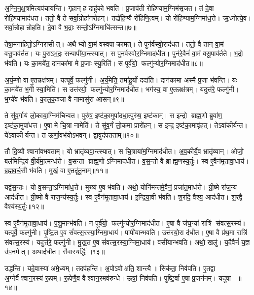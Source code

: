 अ॒ग्नि॒न॒क्ष॒त्रमित्यप॑चायन्ति।
गृ॒हान् ह॒ दाहु॑को भवति।
प्र॒जाप॑ती रोहि॒ण्याम॒ग्निम॑सृजत।
तं दे॒वा रो॑हि॒ण्यामाद॑धत।
ततो॒ वै ते सर्वा॒न्रोहा॑नरोहन्।
तद्रो॑हि॒ण्यै रो॑हिणि॒त्वम्।
यो रो॑हि॒ण्याम॒ग्निमा॑ध॒त्ते।
ऋ॒ध्नोत्ये॒व।
सर्वा॒न्रोहान्रोहति।
दे॒वा वै भ॒द्राः सन्तो॒ऽग्निमाधि॑त्सन्त॥७॥

तेषा॒मना॑हितो॒ऽग्निरासीत्।
अथैभ्यो वा॒मं वस्वपाक्रामत्।
ते पुन॑र्वस्वो॒राद॑धत।
ततो॒ वै तान् वा॒मं वसू॒पाव॑र्तत।
यः पु॒राऽभ॒द्रः सन्पापी॑या॒न्त्स्यात्।
स पुन॑र्वस्वोर॒ग्निमाद॑धीत।
पुन॑रे॒वैनं॑ वा॒मं वसू॒पाव॑र्तते।
भ॒द्रो भ॑वति।
यः का॒मये॑त॒ दानका॑मा मे प्र॒जाः स्यु॒रिति॑।
स पूर्व॑यो॒ फल्गु॑न्योर॒ग्निमाद॑धीत॥८॥

अ॒र्य॒म्णो वा ए॒तन्नक्ष॑त्रम्।
यत्पूर्वे॒ फल्गु॑नी।
अ॒र्य॒मेति॒ तमा॑हु॒र्यो ददा॑ति।
दान॑कामा अस्मै प्र॒जा भ॑वन्ति।
यः का॒मये॑त भ॒गी स्या॒मिति॑।
स उत्त॑रयो॒ फल्गु॑न्योर॒ग्निमाद॑धीत।
भग॑स्य॒ वा ए॒तन्नक्ष॑त्रम्।
यदुत्त॑रे॒ फल्गु॑नी।
भ॒ग्ये॑व भ॑वति।
का॒ल॒क॒ञ्जा वै नामासु॑रा आसन्॥९॥

ते सु॑व॒र्गाय॑ लो॒काया॒ग्निम॑चिन्वत।
पुरु॑ष॒ इष्ट॑का॒मुपा॑दधा॒त्पुरु॑ष॒ इष्ट॑काम्।
स इन्द्रो ब्राह्म॒णो ब्रुवा॑ण॒ इष्ट॑का॒मुपा॑धत्त।
ए॒षा मे॑ चि॒त्रा नामेति॑।
ते सु॑व॒र्गं लो॒कमा प्रारो॑हन्।
स इन्द्र॒ इष्ट॑का॒मावृ॑हत्।
तेऽवा॑कीर्यन्त।
ये॑ऽवाकीर्यन्त।
त ऊर्णा॒वभ॑योऽभवन्।
द्वावुद॑पतताम्॥१०॥

तौ दि॒व्यौ श्वाना॑वभवताम्।
यो भ्रातृ॑व्यवा॒न्त्स्यात्।
स चि॒त्राया॑म॒ग्निमाद॑धीत।
अ॒व॒कीर्यै॒व भ्रातृ॑व्यान्।
ओजो॒ बल॑मिन्द्रि॒यं वी॒र्य॑मा॒त्मन्ध॑त्ते।
व॒सन्ता ब्राह्म॒णोऽग्निमाद॑धीत।
व॒स॒न्तो वै ब्राह्म॒णस्य॒र्तुः।
स्व ए॒वैन॑मृ॒तावा॒धाय॑।
ब्र॒ह्म॒व॒र्च॒सी भ॑वति।
मुखं॒ वा ए॒तदृ॑तू॒नाम्॥११॥

यद्व॑स॒न्तः।
यो व॒सन्ता॒ऽग्निमा॑ध॒त्ते।
मुख्य॑ ए॒व भ॑वति।
अथो॒ योनि॑मन्तमे॒वैनं॒ प्रजा॑त॒माध॑त्ते।
ग्री॒ष्मे रा॑ज॒न्य॑ आद॑धीत।
ग्री॒ष्मो वै रा॑ज॒न्य॑स्य॒र्तुः।
स्व ए॒वैन॑मृ॒तावा॒धाय॑।
इ॒न्द्रि॒या॒वी भ॑वति।
श॒रदि॒ वैश्य॒ आद॑धीत।
श॒रद्वै वैश्य॑स्य॒र्तुः॥१२॥

स्व ए॒वैन॑मृ॒तावा॒धाय॑।
प॒शु॒मान्भ॑वति।
न पूर्व॑यो॒ फल्गु॑न्योर॒ग्निमाद॑धीत।
ए॒षा वै ज॑घ॒न्या॑ रात्रि॑ संवत्स॒रस्य॑।
यत्पूर्वे॒ फल्गु॑नी।
पृ॒ष्टि॒त ए॒व सं॑वत्स॒रस्या॒ग्निमा॒धाय॑।
पापी॑यान्भवति।
उत्त॑रयो॒रा द॑धीत।
ए॒षा वै प्र॑थ॒मा रात्रि॑ संवत्स॒रस्य॑।
यदुत्त॑रे॒ फल्गु॑नी।
मु॒ख॒त ए॒व सं॑वत्स॒रस्या॒ग्निमा॒धाय॑।
वसी॑यान्भवति।
अथो॒ खलु॑।
य॒दैवैनं॑ य॒ज्ञ उ॑प॒नमेत्।
अथाद॑धीत।
सैवास्यर्द्धि॑॥१३॥\anuvakamend[खल्वा॑धित्सन्त॒ फल्गु॑न्योर॒ग्निमाद॑धीतासन्नपततामृतू॒नां वैश्य॑स्य॒र्तुरुत्त॑रे॒ फल्गु॑नी॒ षट्च॑]

उद्ध॑न्ति।
यदे॒वास्या॑ अमे॒ध्यम्।
तदप॑हन्ति।
अ॒पोऽवोक्षति॒ शान्त्यै।
सिक॑ता॒ निव॑पति।
ए॒तद्वा अ॒ग्नेर्वैश्वान॒रस्य॑ रू॒पम्।
रू॒पेणै॒व वैश्वान॒रमव॑रुन्धे।
ऊषां॒ निव॑पति।
पुष्टि॒र्वा ए॒षा प्र॒जन॑नम्।
यदूषा ॥१४॥

